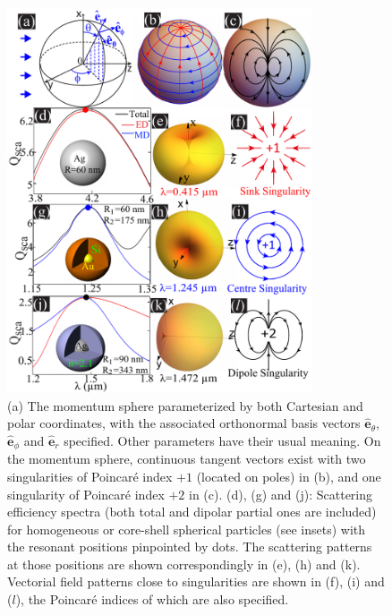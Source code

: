 \documentclass[aps,twocolumn,superscriptaddress]{revtex4-1}
\begin{document}
%
\begin{figure}[tp]

\centerline{\includegraphics[width=9cm]{figure1}} \caption {\small (a) The momentum sphere parameterized by both Cartesian and polar coordinates,  with the associated orthonormal basis vectors $\mathbf{\hat{e}}_\theta$, $\mathbf{\hat{e}}_\phi$ and $\mathbf{\hat{e}}_r$ specified. Other parameters have their usual meaning. On the momentum sphere, continuous tangent vectors exist with two singularities of Poincar\'{e} index $+1$ (located on poles) in (b), and one singularity of Poincar\'{e} index $+2$ in (c). (d), (g) and (j): Scattering efficiency spectra (both total and dipolar partial ones are included) for homogeneous or core-shell spherical particles (see insets) with the resonant positions pinpointed by dots. The scattering patterns at those positions are shown correspondingly in (e), (h) and (k). Vectorial field patterns close to singularities are shown in (f), (i) and ($l$), the Poincar\'{e} indices of which are also specified.}\label{fig1}
\end{figure} %
%
\end{document}
